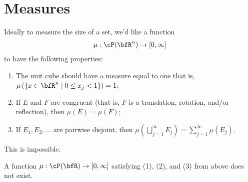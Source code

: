 \chapter{Measures}

Ideally to measure the size of a set, we'd like a function
    \begin{equation*}
    \begin{split}
        \mu:\cP(\bfR^n) \rightarrow [0,\infty]
    \end{split}
    \end{equation*}
to have the following properties:
    \begin{enumerate}[label = (\arabic*),itemsep=1pt,topsep=3pt]
        \item The unit cube should have a measure equal to one \textemdash that is, $\mu \left( \{x \in \bfR^n \mid 0 \leq x_j < 1\} \right) =1 $;
        \item If $E$ and $F$ are congruent (that is, $F$ is a translation, rotation, and/or reflection), then $\mu(E) = \mu(F)$;
        \item If $E_1,E_2,...$ are pairwise disjoint, then $\mu \left( \bigcup_{j = 1}^\infty E_j \right) = \sum_{j = 1}^\infty \mu(E_j)$.
    \end{enumerate}
This is impossible.
    \begin{theorem}
        A function $\mu:\cP(\bfR) \rightarrow [0,\infty]$ satisfying (1), (2), and (3) from above does not exist.
    \end{theorem}
